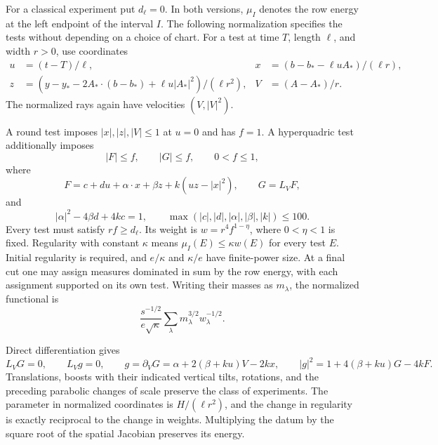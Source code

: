 For a classical experiment put $d_\ell=0$.  In both versions, $\mu_I$ denotes
the row energy at the left endpoint of the interval $I$.  The following
normalization specifies the tests without depending on a choice of chart.
For a test at time $T$, length $\ell$, and width $r>0$, use coordinates
\begin{align*}
 u&=(t-T)/\ell,&
 x&=(b-b_*-\ell uA_*)/(\ell r),\\
 z&=(y-y_*-2A_*\cdot(b-b_*)+\ell u|A_*|^2)/(\ell r^2),&
 V&=(A-A_*)/r.
\end{align*}
The normalized rays again have velocities $(V,|V|^2)$.

\begin{definition}\label{rt:regularity}
A round test imposes $|x|,|z|,|V|\le1$ at $u=0$ and has $f=1$.
A hyperquadric test additionally imposes
\[
 |F|\le f,\qquad |G|\le f,\qquad 0<f\le1,
\]
where
\[
 F=c+du+\alpha\cdot x+\beta z+k(uz-|x|^2),\qquad G=L_VF,
\]
and
\[
 |\alpha|^2-4\beta d+4kc=1,\qquad
 \max(|c|,|d|,|\alpha|,|\beta|,|k|)\le100.
\]
Every test must satisfy $rf\ge d_\ell$.  Its weight is
$w=r^4f^{1-\eta}$, where $0<\eta<1$ is fixed.
Regularity with constant $\kappa$ means $\mu_I(E)\le\kappa w(E)$ for every
test $E$.  Initial regularity is required, and $e/\kappa$ and $\kappa/e$
have finite-power size.  At a final cut one may assign measures dominated
in sum by the row energy, with each assignment supported on its own test.
Writing their masses as $m_\lambda$, the normalized functional is
\[
 \frac{s^{-1/2}}{e\sqrt\kappa}
 \sum_\lambda m_\lambda^{3/2}w_\lambda^{-1/2}.
\]
\end{definition}

Direct differentiation gives
\begin{equation}\label{rt:discriminant-identity}
 L_VG=0,\qquad L_Vg=0,\qquad
 g=\partial_VG=\alpha+2(\beta+ku)V-2kx,
 \qquad |g|^2=1+4(\beta+ku)G-4kF.
\end{equation}
Translations, boosts with their indicated vertical tilts, rotations, and
the preceding parabolic changes of scale preserve the class of experiments.
The parameter in normalized coordinates is $H/(\ell r^2)$, and the change
in regularity is exactly reciprocal to the change in weights.  Multiplying
the datum by the square root of the spatial Jacobian preserves its energy.

